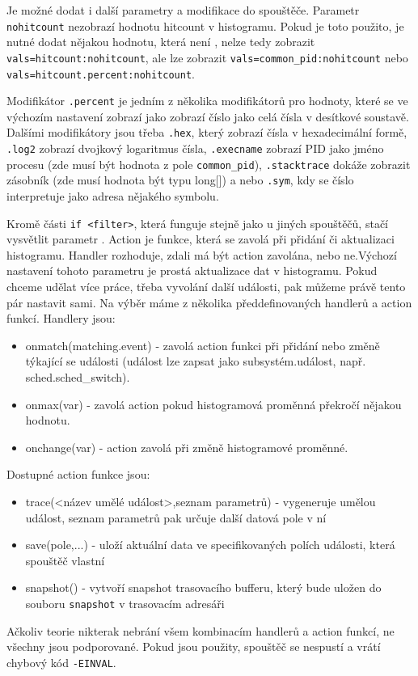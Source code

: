 Je možné dodat i další parametry a modifikace do spouštěče. Parametr \texttt{nohitcount} nezobrazí hodnotu hitcount v histogramu. Pokud je toto použito, je nutné dodat nějakou hodnotu, která není , nelze tedy zobrazit \texttt{vals=hitcount:nohitcount}, ale lze zobrazit \texttt{vals=common\_pid:nohitcount} nebo \texttt{vals=hitcount.percent:nohitcount}.

Modifikátor \texttt{.percent} je jedním z několika modifikátorů pro hodnoty, které se ve výchozím nastavení zobrazí jako zobrazí číslo jako celá čísla v desítkové soustavě. Dalšími modifikátory jsou třeba \texttt{.hex}, který zobrazí čísla v hexadecimální formě, \texttt{.log2} zobrazí dvojkový logaritmus čísla, \texttt{.execname} zobrazí PID jako jméno procesu (zde musí být hodnota z pole \texttt{common\_pid}), \texttt{.stacktrace} dokáže zobrazit zásobník (zde musí hodnota být typu long[]) a nebo \texttt{.sym}, kdy se číslo interpretuje jako adresa nějakého symbolu.

Kromě části \texttt{if <filter>}, která funguje stejně jako u jiných spouštěčů, stačí vysvětlit parametr . Action je funkce, která se zavolá při přidání či aktualizaci histogramu. Handler rozhoduje, zdali má být action zavolána, nebo ne.Výchozí nastavení tohoto parametru je prostá aktualizace dat v histogramu. Pokud chceme udělat více práce, třeba vyvolání další události, pak můžeme právě tento pár nastavit sami. Na výběr máme z několika předdefinovaných handlerů a action funkcí. Handlery jsou:
\begin{itemize}
    \item onmatch(matching.event) - zavolá action funkci při přidání nebo změně týkající se události  (událost lze zapsat jako subsystém.událost, např. sched.sched\_switch).
    \item onmax(var) - zavolá action pokud histogramová proměnná překročí nějakou hodnotu.
    \item onchange(var) - action zavolá při změně histogramové proměnné.
\end{itemize}
Dostupné action funkce jsou:
\begin{itemize}
    \item trace(<název umělé událost>,seznam parametrů) - vygeneruje umělou událost, seznam parametrů pak určuje další datová pole v ní
    \item save(pole,...) - uloží aktuální data ve specifikovaných polích události, která spouštěč vlastní
    \item snapshot() - vytvoří snapshot trasovacího bufferu, který bude uložen do souboru \texttt{snapshot} v trasovacím adresáři
\end{itemize}
Ačkoliv teorie nikterak nebrání všem kombinacím handlerů a action funkcí, ne všechny jsou podporované. Pokud jsou použity, spouštěč se nespustí a vrátí chybový kód \texttt{-EINVAL}.


